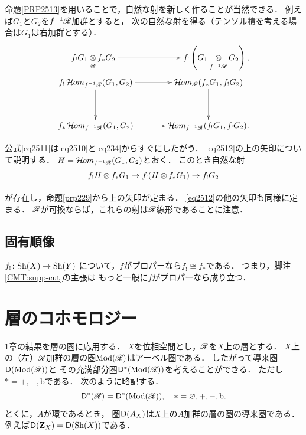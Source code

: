 命題\ref{PRP2513}を用いることで，自然な射を新しく作ることが当然できる．
例えば\(G_1\)と\(G_2\)を\(f^{-1}\mathscr{R}\)加群とすると，
次の自然な射を得る（テンソル積を考える場合は\(G_1\)は右加群とする）．
\begin{align}
    \vcenter{\xymatrix@C=76pt@R=36pt{\displaystyle
        f_{!}G_1\ttens[\scR]f_{\ast}G_2
        \ar[r]^-{}
        &\displaystyle
        f_{!}\left(G_1\ttens[f^{-1}\scR]G_2\right),
    }}\label{eq2511}\\
    \vcenter{\xymatrix@C=36pt@R=36pt{
            f_{!}\HOM_{f^{-1}\scR}(G_1,G_2)
            \ar[r]^-{}
            \ar[d]_-{}
            &
            \HOM_{\scR}(f_{\ast}G_1,f_{!}G_2)
            \ar[d]^-{}
            \\
            f_{\ast}\HOM_{f^{-1}\scR}(G_1,G_2)
            \ar[r]_-{}
            &
            \HOM_{f^{-1}\scR}(f_{!}G_1,f_{!}G_2).
    }}\label{eq2512}
\end{align}

公式\eqref{eq2511}は\eqref{eq2510}と\eqref{eq234}からすぐにしたがう．
\eqref{eq2512}の上の矢印について説明する．
\(H=\mathop{\mathcal{H}\hspace{-0.5pt}om}\nolimits_{f^{-1}\mathscr{R}}(G_1,G_2)\)とおく．
このとき自然な射\[
    f_{!}H\ttens[]f_{\ast}G_{1}\to
    f_{!}(H\ttens[]f_{\ast}G_{1})\to
    f_{!}G_2
\]が存在し，命題\ref{prp229}から上の矢印が定まる．
\eqref{eq2512}の他の矢印も同様に定まる．
\(\mathscr{R}\)が可換ならば，これらの射は\(\mathscr{R}\)線形であることに注意．




















\subsection{固有順像}\label{ssec:pdimg}

\(f_!\colon\mathrm{Sh}(X)\to\mathrm{Sh}(Y)\)
について，\(f\)がプロパーなら\(f_!\cong f_\ast\)である．
つまり，脚注 \ref{CMT:supp-cut}の主張は
もっと一般に\(f\)がプロパーなら成り立つ．



\section{層のコホモロジー}
1章の結果を層の圏に応用する．
\(X\)を位相空間とし，\(\mathscr{R}\)を\(X\)上の層とする．
\(X\)上の（左）\(\mathscr{R}\)加群の層の圏\(\mathop{\mathrm{Mod}}\nolimits(\mathscr{R})\)はアーベル圏である．
したがって導来圏\(\mathsf{D}(\mathop{\mathrm{Mod}}\nolimits(\mathscr{R}))\)と
その充満部分圏\(\mathsf{D}^{\ast}(\mathop{\mathrm{Mod}}\nolimits(\mathscr{R}))\)を考えることができる．
ただし\(\ast=+,-,\mathrm{b}\)である．
次のように略記する．
\begin{equation}
    \mathsf{D}^{\ast}(\mathscr{R})=\mathsf{D}^{\ast}(\mathop{\mathrm{Mod}}\nolimits(\mathscr{R})), \quad \ast=\varnothing,+,-,\mathrm{b}.
\end{equation}
とくに，\(A\)が環であるとき，
圏\(\mathsf{D}(A_X)\)は\(X\)上の\(A\)加群の層の圏の導来圏である．
例えば\(\mathsf{D}(\mathbf{Z}_X)=\mathsf{D}(\mathrm{Sh}(X))\)である．

